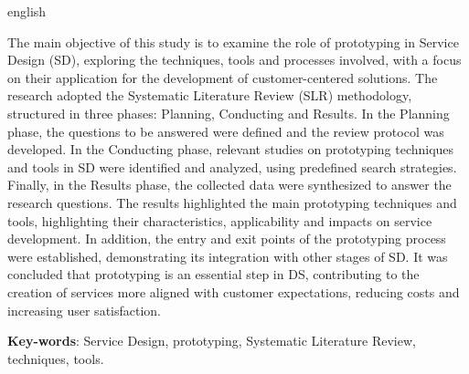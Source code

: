 \begin{resumo}[Abstract]
 \begin{otherlanguage*}{english}
 	
The main objective of this study is to examine the role of prototyping in Service Design (SD), exploring the techniques, tools and processes involved, with a focus on their application for the development of customer-centered solutions. The research adopted the Systematic Literature Review (SLR) methodology, structured in three phases: Planning, Conducting and Results. In the Planning phase, the questions to be answered were defined and the review protocol was developed. In the Conducting phase, relevant studies on prototyping techniques and tools in SD were identified and analyzed, using predefined search strategies. Finally, in the Results phase, the collected data were synthesized to answer the research questions. The results highlighted the main prototyping techniques and tools, highlighting their characteristics, applicability and impacts on service development. In addition, the entry and exit points of the prototyping process were established, demonstrating its integration with other stages of SD. It was concluded that prototyping is an essential step in DS, contributing to the creation of services more aligned with customer expectations, reducing costs and increasing user satisfaction.

   \vspace{\onelineskip}
 
   \noindent 
   \textbf{Key-words}: Service Design, prototyping, Systematic Literature Review, techniques, tools.
 \end{otherlanguage*}
\end{resumo}
